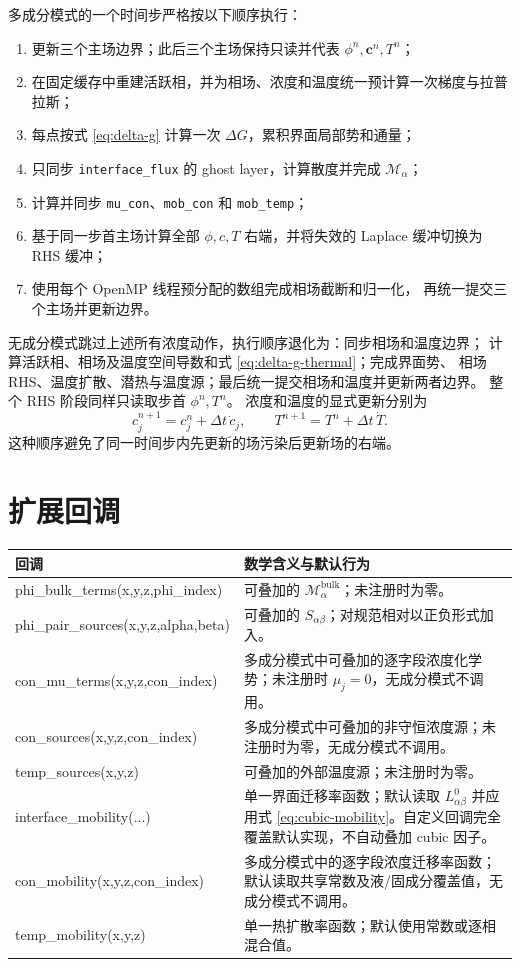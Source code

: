 \documentclass[UTF8,a4paper,11pt]{ctexart}
\newcommand{\vct}[1]{\bm{#1}}
\begin{document}
多成分模式的一个时间步严格按以下顺序执行：
\begin{enumerate}
  \item 更新三个主场边界；此后三个主场保持只读并代表
        \(\phi^n,\vct c^n,T^n\)；
  \item 在固定缓存中重建活跃相，并为相场、浓度和温度统一预计算一次梯度与拉普拉斯；
  \item 每点按式 \eqref{eq:delta-g} 计算一次 \(\Delta G\)，累积界面局部势和通量；
  \item 只同步 \texttt{interface\_flux} 的 ghost layer，计算散度并完成 \(\mathcal M_\alpha\)；
  \item 计算并同步 \texttt{mu\_con}、\texttt{mob\_con} 和 \texttt{mob\_temp}；
  \item 基于同一步首主场计算全部 \(\phi,c,T\) 右端，并将失效的 Laplace 缓冲切换为 RHS 缓冲；
  \item 使用每个 OpenMP 线程预分配的数组完成相场截断和归一化，
        再统一提交三个主场并更新边界。
\end{enumerate}
无成分模式跳过上述所有浓度动作，执行顺序退化为：同步相场和温度边界；
计算活跃相、相场及温度空间导数和式 \eqref{eq:delta-g-thermal}；完成界面势、
相场 RHS、温度扩散、潜热与温度源；最后统一提交相场和温度并更新两者边界。
整个 RHS 阶段同样只读取步首 \(\phi^n,T^n\)。
浓度和温度的显式更新分别为
\[
 c_j^{n+1}=c_j^n+\Delta t\,\dot c_j,\qquad
 T^{n+1}=T^n+\Delta t\,\dot T.
\]
这种顺序避免了同一时间步内先更新的场污染后更新场的右端。

\section{扩展回调}

\begin{longtable}{>{\ttfamily}p{}p{}}
\toprule
\normalfont 回调 & 数学含义与默认行为\\
\midrule
\endhead
phi\_bulk\_terms(x,y,z,phi\_index)
  & 可叠加的 \(\mathcal M_\alpha^{\mathrm{bulk}}\)；未注册时为零。\\
phi\_pair\_sources(x,y,z,alpha,beta)
  & 可叠加的 \(S_{\alpha\beta}\)；对规范相对以正负形式加入。\\
con\_mu\_terms(x,y,z,con\_index)
  & 多成分模式中可叠加的逐字段浓度化学势；未注册时 \(\mu_j=0\)，无成分模式不调用。\\
con\_sources(x,y,z,con\_index)
  & 多成分模式中可叠加的非守恒浓度源；未注册时为零，无成分模式不调用。\\
temp\_sources(x,y,z)
  & 可叠加的外部温度源；未注册时为零。\\
interface\_mobility(...)
  & 单一界面迁移率函数；默认读取 \(L^0_{\alpha\beta}\) 并应用式 \eqref{eq:cubic-mobility}。自定义回调完全覆盖默认实现，不自动叠加 cubic 因子。\\
con\_mobility(x,y,z,con\_index)
  & 多成分模式中的逐字段浓度迁移率函数；默认读取共享常数及液/固成分覆盖值，无成分模式不调用。\\
temp\_mobility(x,y,z)
  & 单一热扩散率函数；默认使用常数或逐相混合值。\\
\bottomrule
\end{longtable}
\end{document}
